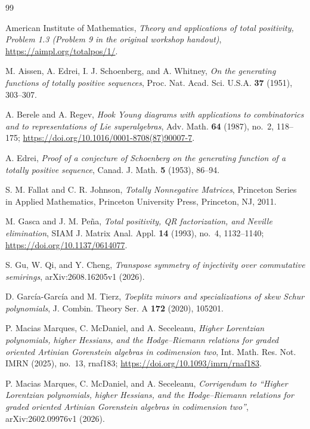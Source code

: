 \documentclass{amsart}
\numberwithin{equation}{section}
\theoremstyle{definition}
\theoremstyle{remark}
\begin{document}
\begin{thebibliography}{99}

American Institute of Mathematics,
\emph{Theory and applications of total positivity, Problem 1.3
(Problem 9 in the original workshop handout)},
\url{https://aimpl.org/totalpos/1/}.

M. Aissen, A. Edrei, I. J. Schoenberg, and A. Whitney,
\emph{On the generating functions of totally positive sequences},
Proc. Nat. Acad. Sci. U.S.A. \textbf{37} (1951), 303--307.

A. Berele and A. Regev,
\emph{Hook Young diagrams with applications to combinatorics and to representations of Lie superalgebras},
Adv. Math. \textbf{64} (1987), no.~2, 118--175;
\url{https://doi.org/10.1016/0001-8708(87)90007-7}.

A. Edrei,
\emph{Proof of a conjecture of Schoenberg on the generating function of a totally positive sequence},
Canad. J. Math. \textbf{5} (1953), 86--94.

S. M. Fallat and C. R. Johnson,
\emph{Totally Nonnegative Matrices},
Princeton Series in Applied Mathematics, Princeton University Press, Princeton, NJ, 2011.

M. Gasca and J. M. Pe\~na,
\emph{Total positivity, QR factorization, and Neville elimination},
SIAM J. Matrix Anal. Appl. \textbf{14} (1993), no.~4, 1132--1140;
\url{https://doi.org/10.1137/0614077}.

S. Gu, W. Qi, and Y. Cheng,
\emph{Transpose symmetry of injectivity over commutative semirings},
arXiv:2608.16205v1 (2026).

D. Garc\'ia-Garc\'ia and M. Tierz,
\emph{Toeplitz minors and specializations of skew Schur polynomials},
J. Combin. Theory Ser. A \textbf{172} (2020), 105201.

P. Macias Marques, C. McDaniel, and A. Seceleanu,
\emph{Higher Lorentzian polynomials, higher Hessians, and the Hodge--Riemann relations for graded oriented Artinian Gorenstein algebras in codimension two},
Int. Math. Res. Not. IMRN (2025), no.~13, rnaf183;
\url{https://doi.org/10.1093/imrn/rnaf183}.

P. Macias Marques, C. McDaniel, and A. Seceleanu,
\emph{Corrigendum to ``Higher Lorentzian polynomials, higher Hessians, and the Hodge--Riemann relations for graded oriented Artinian Gorenstein algebras in codimension two''},
arXiv:2602.09976v1 (2026).


\end{thebibliography}
\end{document}
